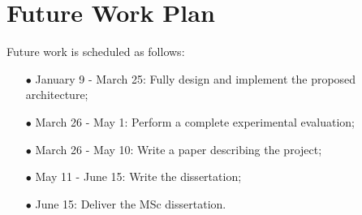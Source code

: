 \section{Future Work Plan}
\label{sec:workplan}

Future work is scheduled as follows:

\begin{itemize}
	\item[$\bullet$] January 9 - March 25: Fully design and implement the proposed architecture;
	\item[$\bullet$] March 26 - May 1: Perform a complete experimental evaluation;
	\item[$\bullet$] March 26 - May 10: Write a paper describing the project;
	\item[$\bullet$] May 11 - June 15: Write the dissertation;
	\item[$\bullet$] June 15: Deliver the MSc dissertation.
\end{itemize}